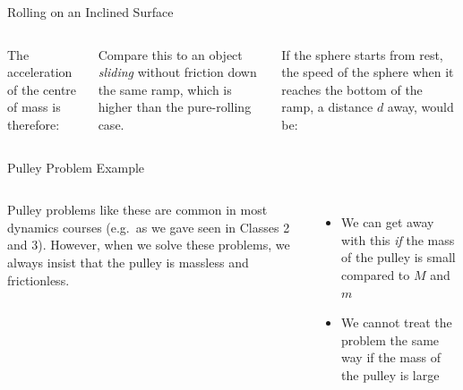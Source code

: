 \documentclass[12pt,compress,aspectratio=169]{beamer}
\begin{document}
\begin{frame}{Rolling on an Inclined Surface}
  \begin{columns}
    

    The acceleration of the centre of mass is therefore:


    \vspace{-.1in}Compare this to an object \emph{sliding} without friction
    down the same ramp, which is higher than the pure-rolling case.
    
    
    \vspace{-.2in}If the sphere starts from rest, the speed of the sphere when
    it reaches the bottom of the ramp, a distance $d$ away, would be:

  \end{columns}
\end{frame}



\begin{frame}{Pulley Problem Example}
  \begin{columns}
    \centering

    Pulley problems like these are common in most dynamics courses (e.g.\ as
    we gave seen in Classes 2 and 3). However, when we solve these problems, we
    always insist that the pulley is massless and frictionless.
    \begin{itemize}
    \item We can get away with this \emph{if} the mass of the pulley is small
      compared to $M$ and $m$
    \item We cannot treat the problem the same way if the mass of the pulley is
      large
    \end{itemize}
  \end{columns}
\end{frame}
\end{document}

